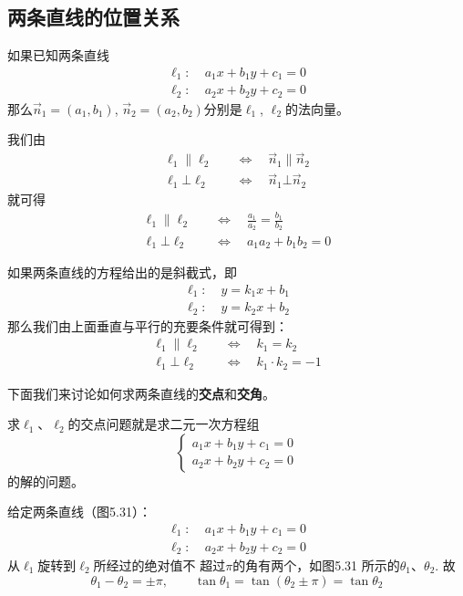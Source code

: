 \subsection{两条直线的位置关系}
如果已知两条直线
\[\begin{split}
  \ell_1:&\; a_1x+b_1y+c_1=0\\
  \ell_2:&\; a_2x+b_2y+c_2=0  
\end{split}\]
那么$\vec{n}_1=(a_1,b_1)$, $\vec{n}_2=(a_2,b_2)$分别是$\ell_1$, $\ell_2$的法向量。

我们由
\[\begin{split}
    \ell_1\parallel \ell_2 \quad &\Longleftrightarrow\quad \vec{n}_1\parallel \vec{n}_2\\
    \ell_1\bot \ell_2 \quad &\Longleftrightarrow\quad \vec{n}_1\bot \vec{n}_2
\end{split}\]
就可得
\[\begin{split}
    \ell_1\parallel \ell_2 \quad &\Longleftrightarrow\quad \frac{a_1}{a_2}=\frac{b_1}{b_2}\\
    \ell_1\bot \ell_2 \quad &\Longleftrightarrow\quad a_1a_2+b_1b_2=0
   \end{split} 
\]

如果两条直线的方程给出的是斜截式，即
\[\begin{split}
    \ell_1:&\; y=k_1x+b_1\\
    \ell_2:&\; y=k_2x+b_2 
  \end{split}\]
那么我们由上面垂直与平行的充要条件就可得到：
\[\begin{split}
    \ell_1\parallel \ell_2 \quad &\Longleftrightarrow\quad k_1=k_2\\
    \ell_1\bot \ell_2 \quad &\Longleftrightarrow\quad k_1\cdot k_2=-1
   \end{split} 
\]

下面我们来讨论如何求两条直线的\textbf{交点}和\textbf{交角}。

求$\ell_1$、$\ell_2$的交点问题就是求二元一次方程组
\[\begin{cases}
    a_1x+b_1y+c_1=0\\
a_2x+b_2y+c_2=0
\end{cases}\]
的解的问题。

给定两条直线（图5.31）：
\[\begin{split}
    \ell_1:&\; a_1x+b_1y+c_1=0\\
    \ell_2:&\; a_2x+b_2y+c_2=0
  \end{split}\]
从$\ell_1$旋转到$\ell_2$所经过的绝对值不
超过$\pi$的角有两个，如图5.31
所示的$\theta_1$、$\theta_2$. 故
\[\theta_1-\theta_2=\pm \pi,\qquad \tan\theta_1=\tan(\theta_2\pm \pi)=\tan\theta_2\]

